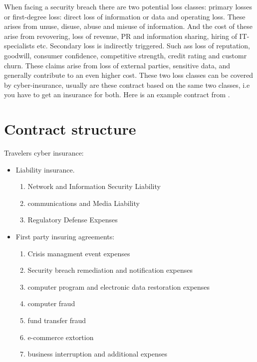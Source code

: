When facing a security breach there are two potential loss classes:
primary losses or first-degree loss: direct loss of information or data and operating loss. 
These arises from unuse, disuse, abuse and misuse of information.
 And the cost of these arise from revovering, loss of revenue, 
 PR and information sharing, hiring of IT-specialists etc. 
Secondary loss is indirectly triggered. Such ass loss of reputation, goodwill, 
consumer confidence, competitive strength, credit rating and customr churn. 
These claims arise from loss of external parties, sensitive data, 
and generally contribute to an even higher cost. \cite{bandyopadhyay2009managers} 
These two loss classes can be covered by cyber-insurance, 
usually are these contract based on the same two classes, i.e you have to get an insurance for both. 
Here is an example contract from \cite{travelers}.
\section{Contract structure}
Travelers cyber insurance:
\begin{itemize}
\item Liability insurance. \begin{enumerate}
\item Network and Information Security Liability
\item communications and Media Liability
\item Regulatory Defense Expenses
\end{enumerate}
\item First party insuring agreements: \begin{enumerate}
\item Crisis managment event expenses
\item Security breach remediation and notification expenses
\item computer program and electronic data restoration expenses
\item computer fraud
\item fund transfer fraud
\item e-commerce extortion
\item business interruption and additional expenses
\end{enumerate}
\end{itemize}
